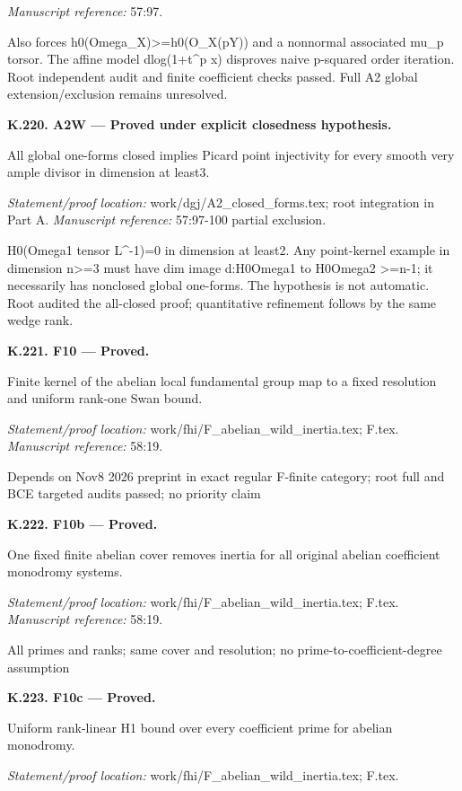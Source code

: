 \emph{Manuscript reference:} 57:97.
\par Also forces h0(Omega\_X)>=h0(O\_X(pY)) and a nonnormal associated mu\_p torsor. The affine model dlog(1+t\textasciicircum{}p x) disproves naive p-squared order iteration. Root independent audit and finite coefficient checks passed. Full A2 global extension/exclusion remains unresolved.
\par\medskip\noindent\textbf{K.220. A2W --- Proved under explicit closedness hypothesis.}\par
All global one-forms closed implies Picard point injectivity for every smooth very ample divisor in dimension at least3.
\par\emph{Statement/proof location:} work/dgj/A2\_closed\_forms.tex; root integration in Part A.
\emph{Manuscript reference:} 57:97-100 partial exclusion.
\par H0(Omega1 tensor L\textasciicircum{}-1)=0 in dimension at least2. Any point-kernel example in dimension n>=3 must have dim image d:H0Omega1 to H0Omega2 >=n-1; it necessarily has nonclosed global one-forms. The hypothesis is not automatic. Root audited the all-closed proof; quantitative refinement follows by the same wedge rank.
\par\medskip\noindent\textbf{K.221. F10 --- Proved.}\par
Finite kernel of the abelian local fundamental group map to a fixed resolution and uniform rank-one Swan bound.
\par\emph{Statement/proof location:} work/fhi/F\_abelian\_wild\_inertia.tex; F.tex.
\emph{Manuscript reference:} 58:19.
\par Depends on Nov8 2026 preprint in exact regular F-finite category; root full and BCE targeted audits passed; no priority claim
\par\medskip\noindent\textbf{K.222. F10b --- Proved.}\par
One fixed finite abelian cover removes inertia for all original abelian coefficient monodromy systems.
\par\emph{Statement/proof location:} work/fhi/F\_abelian\_wild\_inertia.tex; F.tex.
\emph{Manuscript reference:} 58:19.
\par All primes and ranks; same cover and resolution; no prime-to-coefficient-degree assumption
\par\medskip\noindent\textbf{K.223. F10c --- Proved.}\par
Uniform rank-linear H1 bound over every coefficient prime for abelian monodromy.
\par\emph{Statement/proof location:} work/fhi/F\_abelian\_wild\_inertia.tex; F.tex.
